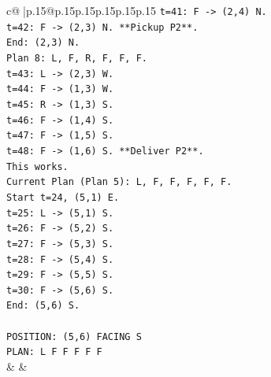 \documentclass{article}
\begin{document}
{\begin{supertabular}{c@{$\;$}|p{.15\linewidth}@{}p{.15\linewidth}p{.15\linewidth}p{.15\linewidth}p{.15\linewidth}p{.15\linewidth}}
{{{\texttt{t=41: F {-}> (2,4) N.} \\
\texttt{t=42: F {-}> (2,3) N. **Pickup P2**.} \\
\texttt{End: (2,3) N.} \\
\texttt{Plan 8: L, F, R, F, F, F.} \\
\texttt{t=43: L {-}> (2,3) W.} \\
\texttt{t=44: F {-}> (1,3) W.} \\
\texttt{t=45: R {-}> (1,3) S.} \\
\texttt{t=46: F {-}> (1,4) S.} \\
\texttt{t=47: F {-}> (1,5) S.} \\
\texttt{t=48: F {-}> (1,6) S. **Deliver P2**.} \\
\texttt{This works.} \\
\texttt{Current Plan (Plan 5): L, F, F, F, F, F.} \\
\texttt{Start t=24, (5,1) E.} \\
\texttt{t=25: L {-}> (5,1) S.} \\
\texttt{t=26: F {-}> (5,2) S.} \\
\texttt{t=27: F {-}> (5,3) S.} \\
\texttt{t=28: F {-}> (5,4) S.} \\
\texttt{t=29: F {-}> (5,5) S.} \\
\texttt{t=30: F {-}> (5,6) S.} \\
\texttt{End: (5,6) S.} \\
\\ 
\texttt{POSITION: (5,6) FACING S} \\
\texttt{PLAN: L F F F F F} \\
            }
        }
    }
    & & \\ \\


\end{supertabular}}
\end{document}
